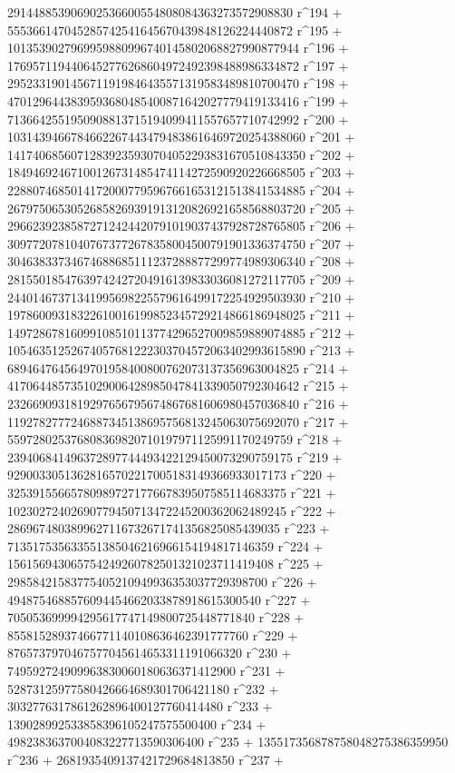        291448853906902536600554808084363273572908830 r^194 + 
       555366147045285742541645670439848126224440872 r^195 + 
       1013539027969959880996740145802068827990877944 r^196 + 
       1769571194406452776268604972492398488986334872 r^197 + 
       2952331901456711919846435571319583489810700470 r^198 + 
       4701296443839593680485400871642027779419133416 r^199 + 
       7136642551950908813715194099411557657710742992 r^200 + 
       10314394667846622674434794838616469720254388060 r^201 + 
       14174068560712839235930704052293831670510843350 r^202 + 
       18494692467100126731485474114272590920226668505 r^203 + 
       22880746850141720007795967661653121513841534885 r^204 + 
       26797506530526858269391913120826921658568803720 r^205 + 
       29662392385872712424420791019037437928728765805 r^206 + 
       30977207810407673772678358004500791901336374750 r^207 + 
       30463833734674688685111237288877299774989306340 r^208 + 
       28155018547639742427204916139833036081272117705 r^209 + 
       24401467371341995698225579616499172254929503930 r^210 + 
       19786009318322610016199852345729214866186948025 r^211 + 
       14972867816099108510113774296527009859889074885 r^212 + 
       10546351252674057681222303704572063402993615890 r^213 + 
       6894647645649701958400800762073137356963004825 r^214 + 
       4170644857351029006428985047841339050792304642 r^215 + 
       2326690931819297656795674867681606980457036840 r^216 + 
       1192782777246887345138695756813245063075692070 r^217 + 
       559728025376808369820710197971125991170249759 r^218 + 
       239406841496372897744493422129450073290759175 r^219 + 
       92900330513628165702217005183149366933017173 r^220 + 
       32539155665780989727177667839507585114683375 r^221 + 
       10230272402690779450713472245200362062489245 r^222 + 
       2869674803899627116732671741356825085439035 r^223 + 
       713517535633551385046216966154194817146359 r^224 + 
       156156943065754249260782501321023711419408 r^225 + 
       29858421583775405210949936353037729398700 r^226 + 
       4948754688576094454662033878918615300540 r^227 + 
       705053699994295617747149800725448771840 r^228 + 
       85581528937466771140108636462391777760 r^229 + 
       8765737970467577045614653311191066320 r^230 + 
       749592724909963830060180636371412900 r^231 + 
       52873125977580426664689301706421180 r^232 + 
       3032776317861262896400127760414480 r^233 + 
       139028992533858396105247575500400 r^234 + 
       4982383637004083227713590306400 r^235 + 
       135517356878758048275386359950 r^236 + 
       2681935409137421729684813850 r^237 + 
